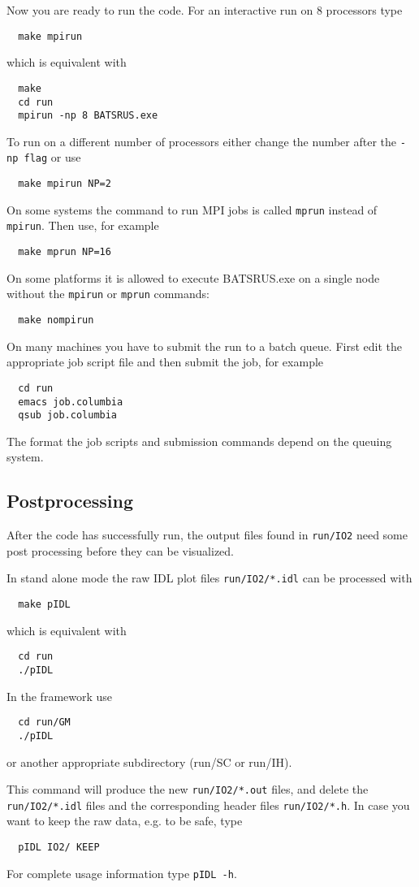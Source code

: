 Now you are ready to run the code. For an interactive run
on 8 processors type
\begin{verbatim}
  make mpirun
\end{verbatim}
which is equivalent with
\begin{verbatim}
  make
  cd run
  mpirun -np 8 BATSRUS.exe
\end{verbatim}
To run on a different number of processors either change the number
after the {\tt -np flag} or use
\begin{verbatim}
  make mpirun NP=2
\end{verbatim}
On some systems the command to run MPI jobs is called {\tt mprun}
instead of {\tt mpirun}. Then use, for example
\begin{verbatim}
  make mprun NP=16
\end{verbatim}
On some platforms it is allowed to execute BATSRUS.exe on a single node 
without the {\tt mpirun} or {\tt mprun} commands:
\begin{verbatim}
  make nompirun
\end{verbatim}
On many machines you have to submit the run to a batch queue.
First edit the appropriate job script file and then submit the job,
for example
\begin{verbatim}
  cd run
  emacs job.columbia 
  qsub job.columbia
\end{verbatim}
The format the job scripts and submission commands depend on
the queuing system. 

\subsection{Postprocessing}

After the code has successfully run, the output files 
found in {\tt run/IO2} need some post processing before 
they can be visualized. 

In stand alone mode the raw IDL plot files {\tt run/IO2/*.idl}
can be processed with
\begin{verbatim}
  make pIDL
\end{verbatim}
which is equivalent with
\begin{verbatim}
  cd run
  ./pIDL
\end{verbatim}
In the framework use
\begin{verbatim}
  cd run/GM
  ./pIDL
\end{verbatim}
or another appropriate subdirectory (run/SC or run/IH).

This command will produce the new {\tt run/IO2/*.out}
files, and delete the {\tt run/IO2/*.idl} files
and the corresponding header files {\tt run/IO2/*.h}.
In case you want to keep the raw data, e.g. to be safe, type
\begin{verbatim}
  pIDL IO2/ KEEP
\end{verbatim}
For complete usage information type {\tt pIDL -h}.

